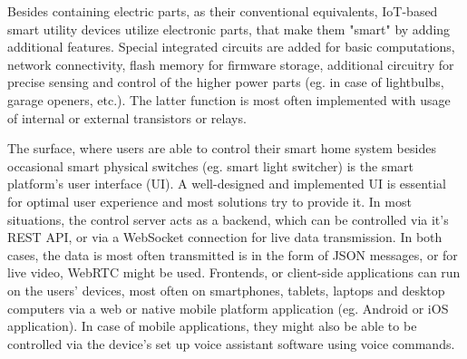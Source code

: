 Besides containing electric parts, as their conventional equivalents, IoT-based smart utility devices utilize electronic parts, that make them "smart" by adding additional features. Special integrated circuits are added for basic computations, network connectivity, flash memory for firmware storage, additional circuitry for precise sensing and control of the higher power parts (eg. in case of lightbulbs, garage openers, etc.). The latter function is most often implemented with usage of internal or external transistors or relays.

The surface, where users are able to control their smart home system besides occasional smart physical switches (eg. smart light switcher) is the smart platform's user interface (UI). A well-designed and implemented UI is essential for optimal user experience and most solutions try to provide it. In most situations, the control server acts as a backend, which can be controlled via it's REST API, or via a WebSocket connection for live data transmission. In both cases, the data is most often transmitted is in the form of JSON messages, or for live video, WebRTC might be used. Frontends, or client-side applications can run on the users' devices, most often on smartphones, tablets, laptops and desktop computers via a web or native mobile platform application (eg. Android or iOS application). In case of mobile applications, they might also be able to be controlled via the device's set up voice assistant software using voice commands.
